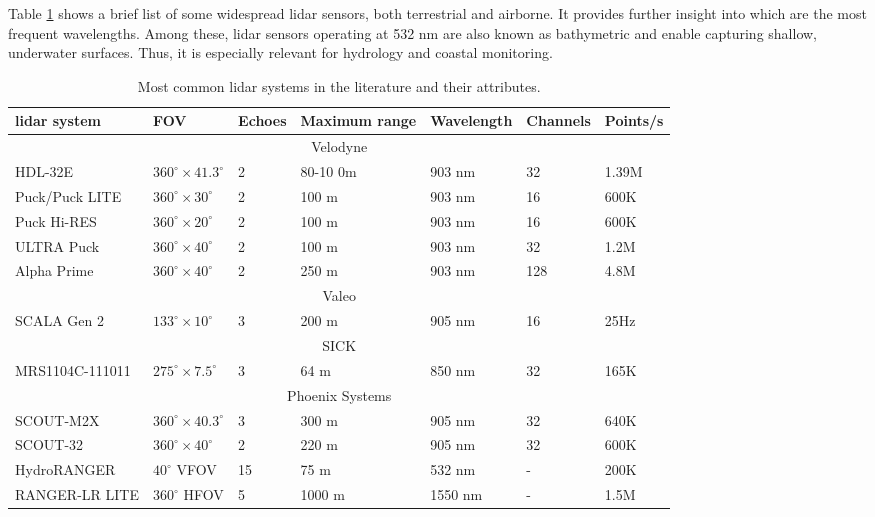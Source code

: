 Table \ref{table:lidar_devices} shows a brief list of some widespread \acrshort{lidar} sensors, both terrestrial and airborne. It provides further insight into which are the most frequent wavelengths. Among these, \acrshort{lidar} sensors operating at 532 \si{\nano\meter} are also known as bathymetric and enable capturing shallow, underwater surfaces. Thus, it is especially relevant for hydrology and coastal monitoring.

\renewcommand{\arraystretch}{1.2}
\begin{table}
    \small
    \caption{Most common \acrshort{lidar} systems in the literature and their attributes.}
    \label{table:lidar_devices}
    \begin{tabular}{lllllll}
        \toprule
        \acrshort{lidar} system & FOV & Echoes & Maximum range & Wavelength & Channels & Points/\si{\second} \\
        \midrule
        \multicolumn{7}{c}{Velodyne}\\
        HDL-32E    & $360^{\circ}\times41.3^{\circ}$    & 2   & 80-10 0\si{\meter} & 903 \si{\nano\meter} & 32 & 1.39M\\
        Puck/Puck LITE    & $360^{\circ}\times30^{\circ}$    & 2   & 100 \si{\meter} & 903 \si{\nano\meter} & 16 & 600K\\
        Puck Hi-RES    & $360^{\circ}\times20^{\circ}$    & 2   & 100 \si{\meter} & 903 \si{\nano\meter} & 16 & 600K\\
        ULTRA Puck    & $360^{\circ}\times40^{\circ}$    & 2   & 100 \si{\meter} & 903 \si{\nano\meter} & 32 & 1.2M\\
        Alpha Prime    & $360^{\circ}\times40^{\circ}$    & 2   & 250 \si{\meter} & 903 \si{\nano\meter} & 128 & 4.8M\\
        \cmidrule{1-7}
        \multicolumn{7}{c}{Valeo}\\
        SCALA Gen 2    & $133^{\circ}\times10^{\circ}$    & 3   & 200 \si{\meter} & 905 \si{\nano\meter} & 16 & 25\si{\hertz}\\
        \cmidrule{1-7}
        \multicolumn{7}{c}{SICK}\\
        MRS1104C-111011    & $275^{\circ}\times7.5^{\circ}$    & 3   & 64 \si{\meter} & 850 \si{\nano\meter} & 32 & 165K\\
        \cmidrule{1-7}
        \multicolumn{7}{c}{Phoenix Systems}\\
        SCOUT-M2X   & $360^{\circ}\times40.3^{\circ}$    & 3  & 300 \si{\meter} & 905 \si{\nano\meter} & 32 & 640K\\
        SCOUT-32   & $360^{\circ}\times40^{\circ}$    & 2  & 220 \si{\meter} & 905 \si{\nano\meter} & 32 & 600K\\
        HydroRANGER   & $40^{\circ}$ VFOV  & 15  & 75 \si{\meter} & 532 \si{\nano\meter} & - & 200K\\
        RANGER-LR LITE   & $360^{\circ}$ HFOV  & 5  & 1000 \si{\meter} & 1550 \si{\nano\meter} & - & 1.5M\\
        \bottomrule
    \end{tabular}
\end{table}
\renewcommand{\arraystretch}{1}


